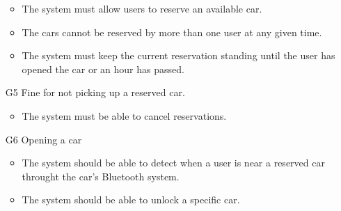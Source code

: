 \begin{itemize}
\begin{itemize}
			\item The system must allow users to reserve an available car.
			\item The cars cannot be reserved by more than one user at any given time.
			\item The system must keep the current reservation standing until the user has opened the car or an hour has passed.
		\end{itemize}
	\item [G5] Fine for not picking up a reserved car. %
		\begin{itemize}
			\item The system must be able to cancel reservations.
		\end{itemize}
	\item [G6] Opening a car %
		\begin{itemize}
			\item The system should be able to detect when a user is near a reserved car throught the car's Bluetooth system.
			\item The system should be able to unlock a specific car.
		\end{itemize}
	
	
	

\end{itemize}
